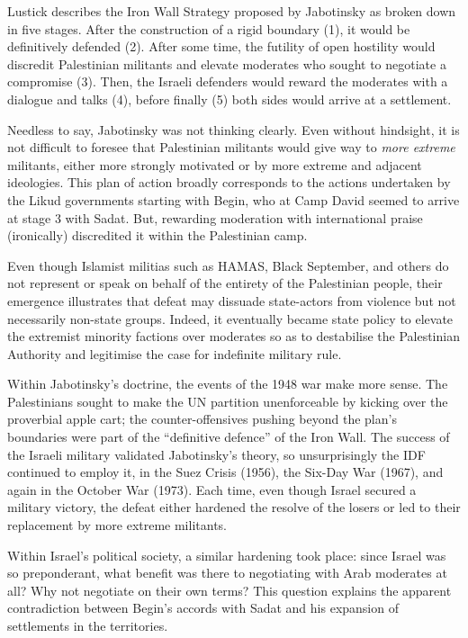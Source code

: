 \documentclass[letterpaper,12pt,twoside]{article} %
\begin{document}
\begin{multicols}{2}
Lustick describes the Iron Wall Strategy proposed by Jabotinsky as broken down in five stages. After the construction of a rigid boundary (1), it would be definitively defended (2). After some time, the futility of open hostility would discredit Palestinian militants and elevate moderates who sought to negotiate a compromise (3). Then, the Israeli defenders would reward the moderates with a dialogue and talks (4), before finally (5) both sides would arrive at a settlement.\autocite{lustick2019paradigm} 

Needless to say, Jabotinsky was not thinking clearly. Even without hindsight, it is not difficult to foresee that Palestinian militants would give way to \textit{more extreme} militants, either more strongly motivated or by more extreme and adjacent ideologies. This plan of action broadly corresponds to the actions undertaken by the Likud governments starting with Begin, who at Camp David seemed to arrive at stage 3 with Sadat. But, rewarding moderation with international praise (ironically) discredited it within the Palestinian camp.

Even though Islamist militias such as HAMAS, Black September, and others do not represent or speak on behalf of the entirety of the Palestinian people, their emergence illustrates that defeat may dissuade state-actors from violence but not necessarily non-state groups. Indeed, it eventually became state policy to elevate the extremist minority factions over moderates so as to destabilise the Palestinian Authority and legitimise the case for indefinite military rule.

Within Jabotinsky's doctrine, the events of the 1948 war make more sense. The Palestinians sought to make the UN partition unenforceable by kicking over the proverbial apple cart; the counter-offensives pushing beyond the plan's boundaries were part of the ``definitive defence'' of the Iron Wall. The success of the Israeli military validated Jabotinsky's theory, so unsurprisingly the IDF continued to employ it, in the Suez Crisis (1956), the Six-Day War (1967), and again in the October War (1973). Each time, even though Israel secured a military victory, the defeat either hardened the resolve of the losers or led to their replacement by more extreme militants.

Within Israel's political society, a similar hardening took place: since Israel was so preponderant, what benefit was there to negotiating with Arab moderates at all? Why not negotiate on their own terms? This question explains the apparent contradiction between Begin's accords with Sadat and his expansion of settlements in the territories.


\end{multicols}
\end{document}
